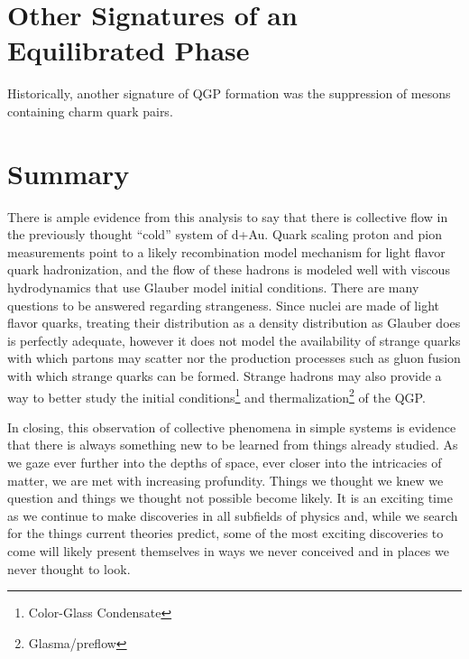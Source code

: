 \section{Other Signatures of an Equilibrated Phase}

Historically, another signature of QGP formation was the suppression of mesons containing charm quark pairs. 

\section{Summary}
There is ample evidence from this analysis to say that there is collective flow in the previously thought ``cold'' system of d+Au. Quark scaling proton and pion measurements point to a likely recombination model mechanism for light flavor quark hadronization, and the flow of these hadrons is modeled well with viscous hydrodynamics that use Glauber model initial conditions. There are many questions to be answered regarding strangeness. Since nuclei are made of light flavor quarks, treating their distribution as a density distribution as Glauber does is perfectly adequate, however it does not model the availability of strange quarks with which partons may scatter nor the production processes such as gluon fusion with which strange quarks can be formed. Strange hadrons may also provide a way to better study the initial conditions\footnote{Color-Glass Condensate} and thermalization\footnote{Glasma/preflow} of the QGP. 

In closing, this observation of collective phenomena in simple systems is evidence that there is always something new to be learned from things already studied. As we gaze ever further into the depths of space, ever closer into the intricacies of matter, we are met with increasing profundity. Things we thought we knew we question and things we thought not possible become likely. It is an exciting time as we continue to make discoveries in all subfields of physics and, while we search for the things current theories predict, some of the most exciting discoveries to come will likely present themselves in ways we never conceived and in places we never thought to look. 

\pagebreak
\pagebreak


